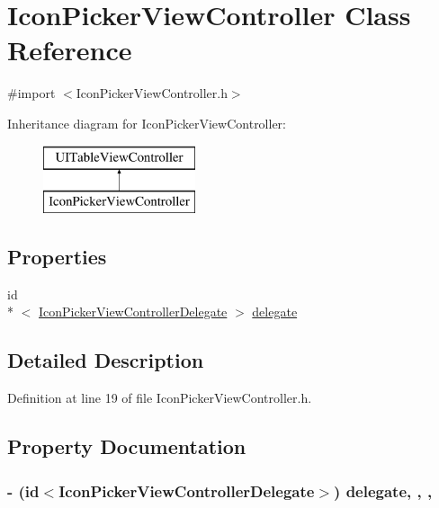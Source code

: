 \hypertarget{interface_icon_picker_view_controller}{\section{Icon\-Picker\-View\-Controller Class Reference}
\label{interface_icon_picker_view_controller}
}


{\ttfamily \#import $<$Icon\-Picker\-View\-Controller.\-h$>$}

Inheritance diagram for Icon\-Picker\-View\-Controller\-:\begin{figure}[H]
\begin{center}
\leavevmode
\includegraphics[height=2.000000cm]{interface_icon_picker_view_controller}
\end{center}
\end{figure}
\subsection*{Properties}
\begin{DoxyCompactItemize}
\item 
id\\*
$<$ \hyperlink{protocol_icon_picker_view_controller_delegate-p}{Icon\-Picker\-View\-Controller\-Delegate} $>$ \hyperlink{interface_icon_picker_view_controller_ac7006828fba2ea1e6f4ba01907845f8d}{delegate}
\end{DoxyCompactItemize}


\subsection{Detailed Description}


Definition at line 19 of file Icon\-Picker\-View\-Controller.\-h.



\subsection{Property Documentation}
\hypertarget{interface_icon_picker_view_controller_ac7006828fba2ea1e6f4ba01907845f8d}{
\subsubsection[{delegate}]{\setlength{\rightskip}{0pt plus 5cm}-\/ (id$<${\bf Icon\-Picker\-View\-Controller\-Delegate}$>$) delegate\hspace{0.3cm}{\ttfamily [read]}, {\ttfamily [write]}, {\ttfamily [nonatomic]}, {\ttfamily [weak]}}}\label{interface_icon_picker_view_controller_ac7006828fba2ea1e6f4ba01907845f8d}


